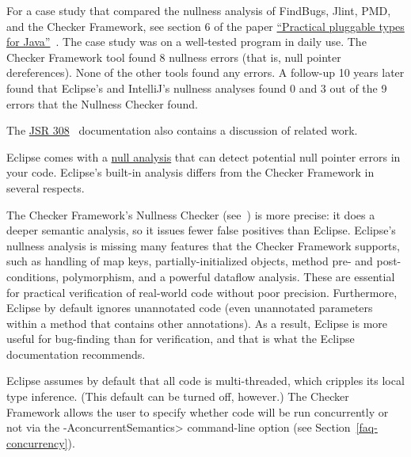 For a case study that compared the nullness analysis of FindBugs, Jlint,
PMD, and the Checker Framework, see section 6 of the paper
\href{https://homes.cs.washington.edu/~mernst/pubs/pluggable-checkers-issta2008.pdf}{``Practical pluggable types for Java''}~\cite{PapiACPE2008}.
The case study was on a well-tested program in daily use.  The Checker
Framework tool found 8 nullness errors (that is, null pointer
dereferences).  None of the other tools found any errors.  A follow-up 10
years later found that Eclipse's and IntelliJ's nullness analyses found 0
and 3 out of the 9 errors that the Nullness Checker found.

The
\href{https://checkerframework.org/jsr308/}{JSR 308}~\cite{JSR308-2008-09-12}
documentation also contains a discussion of related work.



Eclipse comes with a
\href{http://help.eclipse.org/luna/index.jsp?topic=\%2Forg.eclipse.jdt.doc.user\%2Ftasks\%2Ftask-using_null_annotations.htm}{null analysis} that
can detect potential null pointer errors in your code.  Eclipse's built-in
analysis differs from the Checker Framework in several respects.

The Checker Framework's Nullness Checker
(see~) is more precise:  it does a deeper
semantic analysis, so it issues fewer false positives than Eclipse.
Eclipse's nullness analysis is missing many features that the Checker
Framework supports, such as handling of map keys, partially-initialized
objects, method pre- and post-conditions, polymorphism, and a powerful
dataflow analysis.  These are essential for practical verification of
real-world code without poor precision.
Furthermore, Eclipse by default ignores unannotated code (even unannotated
parameters within a method that contains other annotations).
As a result, Eclipse is more useful for bug-finding than for verification,
and that is what the Eclipse documentation recommends.

Eclipse assumes by default that all code is multi-threaded, which cripples its local
type inference.  (This default can be turned off, however.)
The Checker Framework allows the user to
specify whether code will be run concurrently or not via the
\<-AconcurrentSemantics> command-line option (see
Section~\ref{faq-concurrency}).

